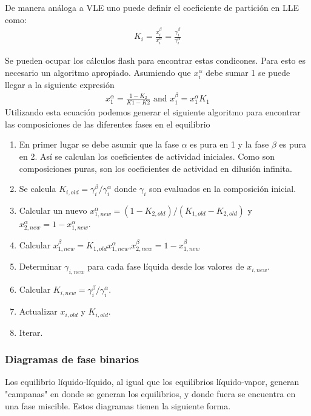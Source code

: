 De manera análoga a VLE uno puede definir el coeficiente de partición en LLE como:
\begin{align}
    K_i=\frac{x_i^{\beta}}{x_i^{\alpha}}=\frac{\gamma_i^{\beta}}{\gamma_i^{\alpha}}
\end{align}

Se pueden ocupar los cálculos flash para encontrar estas condicones. Para esto es necesario un algoritmo apropiado. 
Asumiendo que $x_i^{\alpha}$ debe sumar 1 se puede llegar a la siguiente expresión
\begin{align}
    x_1^{\alpha}=\frac{1-K_2}{K1-K2} \text{ and } x_1^{\beta}=x_1^{\alpha}K_1
\end{align}
Utilizando esta ecuación podemos generar el siguiente algoritmo para encontrar las composiciones de las diferentes fases en el equilibrio
\begin{enumerate}
    \item En primer lugar se debe asumir que la fase $\alpha$ es pura en 1 y la fase $\beta$ es pura en 2. Así se calculan los coeficientes de actividad iniciales. Como son composiciones puras, son los coeficientes de actividad en dilusión infinita.
    \item Se calcula $K_{i,old}=\gamma_i^{\beta}/\gamma_i^{\alpha}$ donde $\gamma_i$ son evaluados en la composición inicial.
    \item Calcular un nuevo $ x_{1,new}^{\alpha}=(1-K_{2,old})/(K_{1,old}-K_{2,old})$ y $x_{2,new}^{\alpha}=1-x_{1,new}^{\alpha}$.
    \item Calcular $x_{1,new}^{\beta}=K_{1,old} x_{1,new}^{\alpha}$,$x_{2,new}^{\beta}=1-x_{1,new}^{\beta}$
    \item Determinar $\gamma_{i,new}$ para cada fase líquida desde los valores de $x_{i,new}$.
    \item Calcular $K_{i,new}=\gamma_i^{\beta}/\gamma_i^{\alpha}$.
    \item Actualizar $x_{i,old}$ y $K_{i,old}$.
    \item Iterar.
\end{enumerate}
\subsubsection{Diagramas de fase binarios}

Los equilibrio líquido-líquido, al igual que los equilibrios líquido-vapor, generan "campanas" en donde se generan los equilibrios, y donde fuera se encuentra en una fase miscible.
Estos diagramas tienen la siguiente forma.

